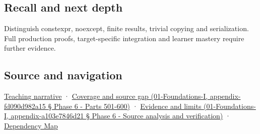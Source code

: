 \subsection{Recall and next depth}\label{recall-and-next-depth}

Distinguish constexpr, noexcept, finite results, trivial copying and serialization. Full production proofs, target-specific integration and learner mastery require further evidence.

\subsection{Source and navigation}\label{source-and-navigation}

\href{Continuous\%20Notes/Computing\%20Foundations\%20-\%20From\%20Bits\%20to\%20C++\%20and\%20Systems\%20APIs\#Three\%20stored\%20numbers\%20are\%20not\%20the\%20complete\%20contract}{Teaching narrative} · \href{}{Coverage and source gap (01-Foundations-I, appendix-fd090d982a15 § Phase 6 - Parts 501-600)} · \href{}{Evidence and limits (01-Foundations-I, appendix-a103e7846d21 § Phase 6 - Source analysis and verification)} · \hyperref[appendix-4ad47bdd269a]{Dependency Map}
